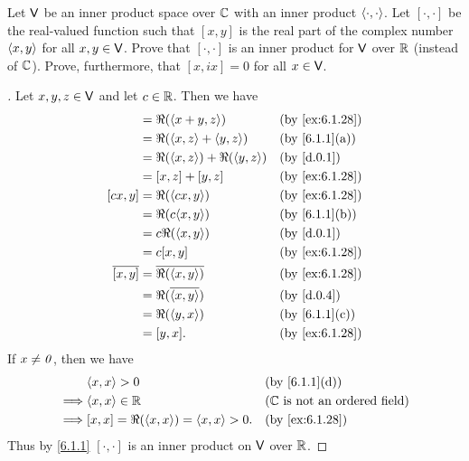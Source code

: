 \begin{ex}\label{ex:6.1.28}
  Let \(\mathsf{V}\) be an inner product space over \(\mathbb{C}\) with an inner product \(\left\langle\cdot, \cdot\right\rangle\).
  Let \([\cdot, \cdot]\) be the real-valued function such that \([x, y]\) is the real part of the complex number \(\left\langle x, y\right\rangle\) for all \(x, y \in \mathsf{V}\).
  Prove that \([\cdot, \cdot]\) is an inner product for \(\mathsf{V}\) over \(\mathbb{R}\) (instead of \(\mathbb{C}\)).
  Prove, furthermore, that \([x, ix] = 0\) for all \(x \in \mathsf{V}\).
\end{ex}

\begin{proof}[]
  Let \(x, y, z \in \mathsf{V}\) and let \(c \in \mathbb{R}\).
  Then we have
  \begin{align*}
    [x + y, z]    & = \Re(\inn{x + y, z})               &  & \by{ex:6.1.28} \\
                  & = \Re(\inn{x, z} + \inn{y, z})      &  & \by{6.1.1}[a]  \\
                  & = \Re(\inn{x, z}) + \Re(\inn{y, z}) &  & \by{d.0.1}     \\
                  & = [x, z] + [y, z]                   &  & \by{ex:6.1.28} \\
    [cx, y]       & = \Re(\inn{cx, y})                  &  & \by{ex:6.1.28} \\
                  & = \Re(c \inn{x, y})                 &  & \by{6.1.1}[b]  \\
                  & = c \Re(\inn{x, y})                 &  & \by{d.0.1}     \\
                  & = c [x, y]                          &  & \by{ex:6.1.28} \\
    \conj{[x, y]} & = \conj{\Re(\inn{x, y})}            &  & \by{ex:6.1.28} \\
                  & = \Re(\conj{\inn{x, y}})            &  & \by{d.0.4}     \\
                  & = \Re(\inn{y, x})                   &  & \by{6.1.1}[c]  \\
                  & = [y, x].                           &  & \by{ex:6.1.28}
  \end{align*}
  If \(x \neq \mathit{0}\), then we have
  \begin{align*}
             & \inn{x, x} > 0                             &  & \by{6.1.1}[d]                           \\
    \implies & \inn{x, x} \in \R                          &  & \text{(\(\C\) is not an ordered field)} \\
    \implies & [x, x] = \Re(\inn{x, x}) = \inn{x, x} > 0. &  & \by{ex:6.1.28}
  \end{align*}
  Thus by \cref{6.1.1} \([\cdot, \cdot]\) is an inner product on \(\mathsf{V}\) over \(\mathbb{R}\).


\end{proof}
